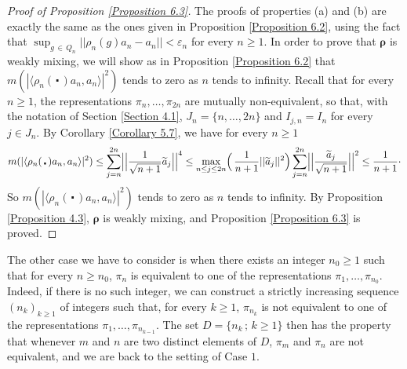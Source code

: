 \documentclass[11pt,english,a4paper]{smfart}
\numberwithin{equation}{section}
\theoremstyle{definition}
\begin{document}
\begin{proof}[Proof of Proposition \ref{Proposition 6.3}]
The proofs of properties (a) and (b) are exactly the same as the ones 
given in Proposition \ref{Proposition 6.2}, using the fact that 
$\sup_{g\,\in\,{Q_{n}}}||\rho _{n}(g){a_{n}}-{a_{n}}||<{\varepsilon _{n}}$ for every ${n\ge 1}$. In 
order to 
prove that $\pmb{\rho} $ is weakly mixing, we will show as in 
Proposition \ref{Proposition 6.2} that
$m(|{\ensuremath{{\langle {\rho
_{n}(\,\centerdot\,){a_{n}}},{a_{n}}\rangle}}}|^{2})$ tends to zero as $n$ tends to 
infinity.
Recall that for every ${n\ge 1}$, the representations $\pi _{n},\dots,\pi 
_{2n}$ are mutually non-equivalent, so that, with the notation of Section \ref{Section 4.1}, $J_{n}=\{n,\ldots, 2n\}$ and $I_{j,n}=I_{n}$ for every $j\in J_{n}$. By Corollary \ref{Corollary 5.7}, we 
have for every ${n\ge 1}$
\[
 m(|{\ensuremath{{\langle {\rho_{n}(\,\centerdot\,){a_{n}}},{a_{n}}\rangle}}}|^{2})\le
 \sum_{j=n}^{2n}\Bigl|\Bigl|\dfrac{1}{\sqrt{n+1}}{\widetilde{{a}}}_{j} \Bigr| 
\Bigr|^{4}\le \max_{n\le j\le 2n}
\Bigl(\,\dfrac{1}{n+1}||{\widetilde{{a}}}_{j}||^{2}\Bigr)
\sum_{j=n}^{2n}\Bigl|\Bigl|\dfrac{{\widetilde{{a}}}_{j}}{\sqrt{n+1}} \Bigr|\Bigr|^{2}
\le\dfrac{1}{n+1}\cdot 
\]
So $m(|{\ensuremath{{\langle {\rho_{n}(\,\centerdot\,){a_{n}}},{a_{n}}\rangle}}}|^{2})$ tends to zero as $n$ tends 
to infinity. By Proposition \ref{Proposition 4.3},
$\pmb{\rho }$ is weakly mixing, and Proposition \ref{Proposition 
6.3} is 
proved.
\end{proof}

The other case we have to consider is when there exists an integer $n_{0}\ge 1$ such that for every $n\ge n_{0}$, $\pi_{n}$ is equivalent to one of the representations $\pi _{1},\dots,\pi _{n_{0}}$. Indeed, if there is no such integer, we can construct a strictly increasing sequence $(n_{k})_{k\ge 1}$ of integers such that, for every $k\ge 1$, $\pi_{n_{k}}$ is not equivalent to one of the representations $\pi _{1},\dots,\pi _{n_{k-1}}$. The set $D=\{n_{k}\, ;\, k\ge 1\}$ then has the property that whenever $m$ and $n$ are two distinct elements of $D$, $\pi_{m}$ and $\pi_{n}$ are not equivalent, and we are back to the setting of Case $1$.
\end{document}
